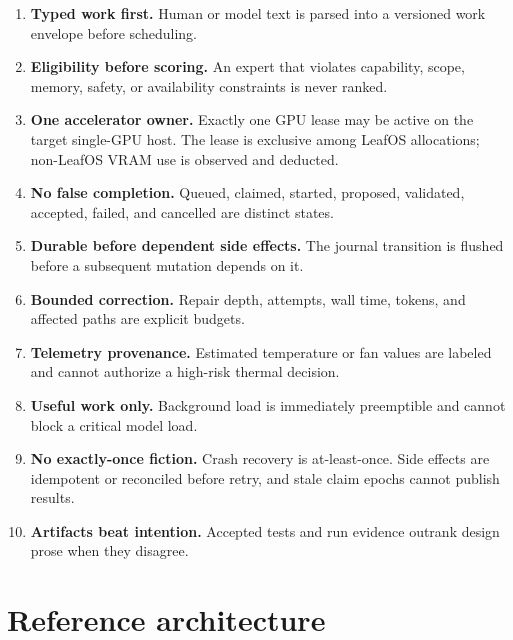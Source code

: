 \documentclass[11pt,letterpaper]{article}
\begin{document}
\begin{enumerate}
  \item \textbf{Typed work first.} Human or model text is parsed into a versioned
        work envelope before scheduling.
  \item \textbf{Eligibility before scoring.} An expert that violates capability,
        scope, memory, safety, or availability constraints is never ranked.
  \item \textbf{One accelerator owner.} Exactly one GPU lease may be active on
        the target single-GPU host. The lease is exclusive among LeafOS
        allocations; non-LeafOS VRAM use is observed and deducted.
  \item \textbf{No false completion.} Queued, claimed, started, proposed,
        validated, accepted, failed, and cancelled are distinct states.
  \item \textbf{Durable before dependent side effects.} The journal transition
        is flushed before a subsequent mutation depends on it.
  \item \textbf{Bounded correction.} Repair depth, attempts, wall time, tokens,
        and affected paths are explicit budgets.
  \item \textbf{Telemetry provenance.} Estimated temperature or fan values are
        labeled and cannot authorize a high-risk thermal decision.
  \item \textbf{Useful work only.} Background load is immediately preemptible
        and cannot block a critical model load.
  \item \textbf{No exactly-once fiction.} Crash recovery is at-least-once.
        Side effects are idempotent or reconciled before retry, and stale
        claim epochs cannot publish results.
  \item \textbf{Artifacts beat intention.} Accepted tests and run evidence
        outrank design prose when they disagree.
\end{enumerate}

\section{Reference architecture}
\end{document}
